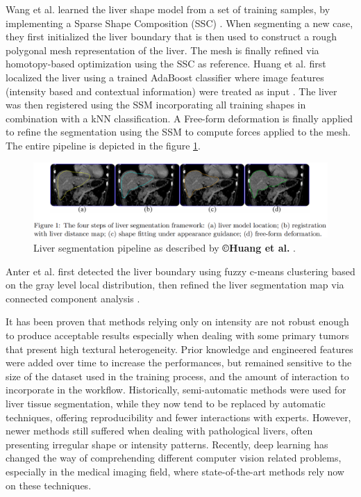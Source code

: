\documentclass[]{article}
\begin{document}
	Wang et al. learned the liver shape model from a set of training
	samples, by implementing a Sparse Shape Composition (SSC) \cite{Wang2015b}. When
	segmenting a new case, they first initialized the liver boundary that is
	then used to construct a rough polygonal mesh representation of the
	liver. The mesh is finally refined via homotopy-based optimization using
	the SSC as reference.
	Huang et al. first localized the liver using a trained AdaBoost
	classifier where image features (intensity based and contextual
	information) were treated as input \cite{Huang2014}. The liver was then registered using
	the SSM incorporating all training shapes in combination with a kNN
	classification. A Free-form deformation is finally applied to refine the
	segmentation using the SSM to compute forces applied to the mesh. The
	entire pipeline is depicted in the figure \ref{Huang2014_Fig1}.
	
	\begin{figure}[th!]
		\centering
		\includegraphics[width=0.7\linewidth]{images/image9}
		\caption{Liver segmentation pipeline as described by \textbf{©Huang et al.} \cite{Huang2014}.}
		\label{Huang2014_Fig1}
	\end{figure}
	
	
	Anter et al. first detected the liver boundary using fuzzy c-means
	clustering based on the gray level local distribution, then refined the
	liver segmentation map via connected component analysis \cite{Anter2014}.
	
	It has been proven that methods relying only on intensity are not robust
	enough to produce acceptable results especially when dealing with some
	primary tumors that present high textural heterogeneity. Prior knowledge
	and engineered features were added over time to increase the
	performances, but remained sensitive to the size of the dataset used in
	the training process, and the amount of interaction to incorporate in
	the workflow.
	Historically, semi-automatic methods were used for liver tissue
	segmentation, while they now tend to be replaced by automatic
	techniques, offering reproducibility and fewer interactions with
	experts. However, newer methods still suffered when dealing with
	pathological livers, often presenting irregular shape or intensity
	patterns.
	Recently, deep learning has changed the way of comprehending different
	computer vision related problems, especially in the medical imaging
	field, where state-of-the-art methods rely now on these techniques.
	
\end{document}
